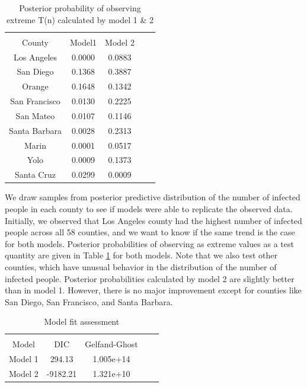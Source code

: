 \documentclass[11pt,twocolumn]{asaproc}
\begin{document}
\begin{table}
\caption{Posterior probability of observing extreme T(n) calculated by model 1 \& 2}
\label{tab:postprobs}
\begin{center}
\begin{tabular}{ccccc}
\hline
\hline
\\[-5pt]
\multicolumn{1}{c}{County} &
\multicolumn{1}{c}{Model1} &
\multicolumn{1}{c}{Model 2}\\
\hline
 Los Angeles&	0.0000 &	0.0883\\
San Diego & 0.1368 &	0.3887\\
Orange & 0.1648 & 0.1342 \\
San Francisco & 0.0130  & 0.2225\\
San Mateo & 0.0107 & 0.1146\\
Santa Barbara & 0.0028 & 0.2313\\
Marin & 0.0001 & 0.0517\\
Yolo & 0.0009 & 0.1373\\
Santa Cruz & 0.0299 & 0.0009\\
\hline
\end{tabular}
\end{center}
\end{table}


We draw samples from posterior predictive distribution of the number of infected people in each county to see if models were able to replicate the observed data. Initially, we observed that Los Angeles county had the highest number of infected people across all 58 counties, and we want to know if the same trend is the case for both models. Posterior probabilities of observing as extreme values as a test quantity are given in Table \ref{tab:postprobs} for both models. Note that we also test other counties, which have unusual behavior in the distribution of the number of infected people. Posterior probabilities calculated by model 2 are slightly better than in model 1. However, there is no major improvement except for counties like San Diego, San Francisco, and Santa Barbara.


\begin{table}
\label{table:anan}
\caption{Model fit assessment}
\begin{center}
\begin{tabular}{ccccc}
\hline
\hline
\\[-5pt]
\multicolumn{1}{c}{Model} &
\multicolumn{1}{c}{DIC} &
\multicolumn{1}{c}{Gelfand-Ghost}\\
\hline
 Model 1&	294.13&	1.005e+14\\
Model 2&	-9182.21&	1.321e+10\\
\hline
\end{tabular}
\end{center}
\end{table}
\end{document}
